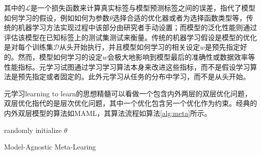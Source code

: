 


其中的\(\mathcal{L}\)是一个损失函数来计算真实标签与模型预测标签之间的误差，指代了模型如何学习的假设，例如如何为参数\(\theta\)选择合适的优化器或者为选择函数类型等，传统的机器学习方法实现过程中该部分由研究者手动设置；而模型的泛化性能则通过评估该模型在已知标签上的测试集测试来衡量。传统的机器学习假设是模型的优化是对每个训练集\(\mathcal{D}\)从头开始执行，并且模型如何学习的相关设定\(w\)是预先指定好的。然而，模型如何学习的设定\(w\)会极大地影响到模型最后的准确性或数据效率等性能指标。元学习试图通过学习学习算法本身来改进这些指标，而不是假设学习算法是预先指定或者固定的。此外元学习从任务的分布中学习，而不是从头开始。

元学习learning to learn的思想精髓可以看做一个包含内外两层的双层优化问题，双层优化\cite{stackelberg1952theory}指代的是层次优化问题，其中一个优化包含另一个优化作为约束\cite{franceschi2018bilevel}\cite{sinha2017review}。经典的内外双层模型的算法如MAML，其算法流程如算法\ref{alg:meta}所示。


\begin{algorithm}
  randomly initialize \(\theta\) \\
\caption{Model-Agnostic Meta-Learing}\label{alg:meta}
\end{algorithm}

